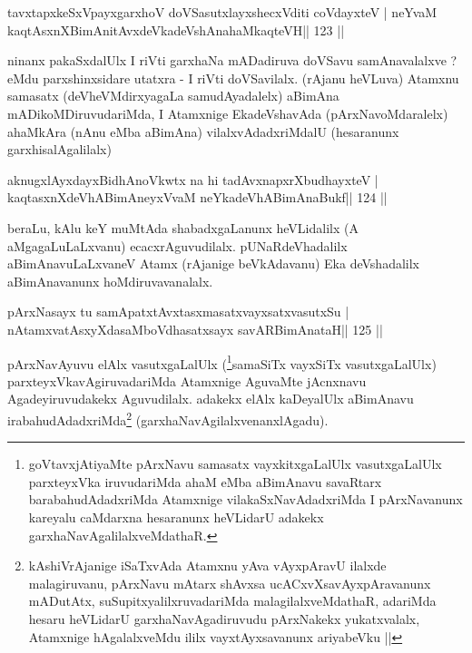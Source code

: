 \begin{shl}
tavxtapxkeSxV\s payxgarxhoV doVSasutxlayxshecxVditi coVdayxteV |
neYvaM kaqtAsxnXBimAnitAvxdeVkadeVshAnahaMkaqteVH\hfill || 123 ||
\end{shl}

\begin{artha}
ninanx pakaSxdalUlx I riVti garxhaNa mADadiruva doVSavu samAnavalalxve ? eMdu parxshinxsidare utatxra - I riVti doVSavilalx. (rAjanu heVLuva) Atamxnu samasatx (deVheVMdirxyagaLa samudAyadalelx) aBimAna mADikoMDiruvudariMda, I Atamxnige EkadeVshavAda (pArxNavoMdaralelx) ahaMkAra (nAnu eMba aBimAna) vilalxvAdadxriMdalU (hesaranunx garxhisalAgalilalx) 
\end{artha} 


\begin{shl}
aknugxlAyxdayxBidhAnoVkwtx na hi tadAvxnapxrXbudhayxteV |
kaqtasxnXdeVhABimAneyxVvaM neYkadeVhABimAnaBukf\hfill || 124 ||
\end{shl}

\begin{artha}
beraLu, kAlu keY muMtAda shabadxgaLanunx heVLidalilx (A  aMgagaLuLaLxvanu) \-ecacxrAguvudilalx. pUNaRdeVhadalilx  aBimAnavuLaLxvaneV Atamx (rAjanige beVkAda\-vanu) Eka deVshadalilx aBimAnavanunx hoMdiruvavanalalx.
\end{artha}

\begin{shl}
pArxNasayx tu samApatxtAvxtasxmasatxvayxsatxvasutxSu |
nA\s\s tamxvatAsxyXdasaMboVdhasatxsayx savARBimAnataH\hfill || 125 ||
\end{shl}

\begin{artha}
pArxNavAyuvu elAlx vasutxgaLalUlx (\footnote[13]{goVtavxjAtiyaMte  pArxNavu samasatx vayxkitxgaLalUlx vasutxgaLalUlx parxteyxVka iruvudariMda ahaM eMba aBimAnavu savaRtarx barabahudAdadxriMda Atamxnige vilakaSxNavAdadxriMda I pArxNavanunx kareyalu caMdarxna hesaranunx heVLidarU adakekx garxhaNavAgalilalxveMdathaR.}samaSiTx vayxSiTx vasutxgaLalUlx) parxteyxVka\-vAgiruvadariMda Atamxnige AguvaMte jAcnxnavu Agadeyiruvudakekx Aguvudilalx. adakekx elAlx kaDeyalUlx aBimAnavu irabahudAdadxriMda\footnote[14]{kAshiVrAjanige iSaTxvAda Atamxnu yAva vAyxpAravU ilalxde malagiruvanu, pArxNavu mAtarx shAvxsa ucACxvXsavAyxpAravanunx mADutAtx, suSupitxyalilxruvadariMda malagilalxveMdathaR, adariMda hesaru heVLidarU garxhaNavAgadiruvudu pArxNakekx yukatxvalalx, Atamxnige hAgalalxveMdu ililx vayxtAyxsavanunx ariyabeVku ||} (garxhaNavAgilalxvenanxlAgadu).
\end{artha}

